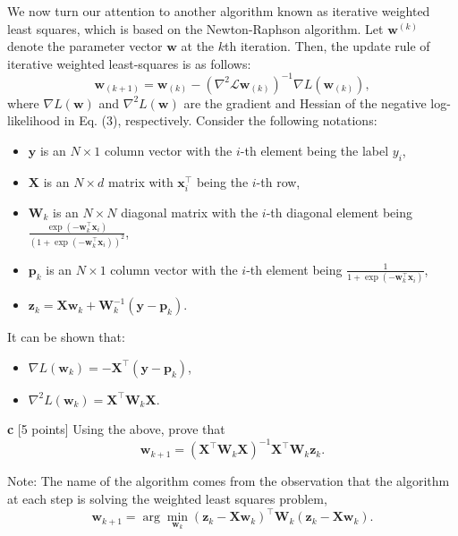 \documentclass[a3paper,12pt]{extarticle} %
\begin{document}
We now turn our attention to another algorithm known as iterative weighted least squares, which is based on the Newton-Raphson algorithm. Let $\mathbf{w}^{(k)}$ denote the parameter vector $\mathbf{w}$ at the $k$th iteration. Then, the update rule of iterative weighted least-squares is as follows:
\[
\mathbf{w}_{(k+1)} = \mathbf{w}_{(k)} - \left( \nabla^2\mathcal{L}\mathbf{w}_{(k)} \right)^{-1} \nabla L(\mathbf{w}_{(k)}),
\]
where \( \nabla L(\mathbf{w}) \) and \( \nabla^2 L(\mathbf{w}) \) are the gradient and Hessian of the negative log-likelihood in Eq. (3), respectively. Consider the following notations:
\begin{itemize}
    \item \( \mathbf{y} \) is an \( N \times 1 \) column vector with the \( i \)-th element being the label \( y_i \),
    \item \( \mathbf{X} \) is an \( N \times d \) matrix with \( \mathbf{x}_i^\top \) being the \( i \)-th row,
    \item \( \mathbf{W}_k \) is an \( N \times N \) diagonal matrix with the \( i \)-th diagonal element being \( \frac{\exp(-\mathbf{w}_k^\top \mathbf{x}_i)}{(1 + \exp(-\mathbf{w}_k^\top \mathbf{x}_i))^2} \),
    \item \( \mathbf{p}_k \) is an \( N \times 1 \) column vector with the \( i \)-th element being \( \frac{1}{1 + \exp(-\mathbf{w}_k^\top \mathbf{x}_i)} \),
    \item \( \mathbf{z}_k = \mathbf{X} \mathbf{w}_k + \mathbf{W}_k^{-1} (\mathbf{y} - \mathbf{p}_k) \).
\end{itemize}

It can be shown that:
\begin{itemize}
    \item \( \nabla L(\mathbf{w}_k) = -\mathbf{X}^\top (\mathbf{y} - \mathbf{p}_k) \),
    \item \( \nabla^2 L(\mathbf{w}_k) = \mathbf{X}^\top \mathbf{W}_k \mathbf{X} \).
\end{itemize}

\textbf{ c }[5 points] Using the above, prove that
\[
\mathbf{w}_{k+1} = (\mathbf{X}^\top \mathbf{W}_k \mathbf{X})^{-1} \mathbf{X}^\top \mathbf{W}_k \mathbf{z}_k.
\]

Note: The name of the algorithm comes from the observation that the algorithm at each step is solving the weighted least squares problem,
\[
\mathbf{w}_{k+1} = \arg\min_{\mathbf{w}_k} (\mathbf{z}_k - \mathbf{X} \mathbf{w}_k)^\top \mathbf{W}_k (\mathbf{z}_k - \mathbf{X} \mathbf{w}_k).
\]
\newpage
\end{document}
